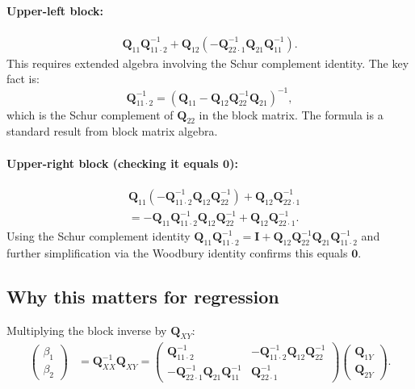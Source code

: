 \documentclass[12pt]{article}
\newcommand{\bfQ}{\mathbf{Q}}
\theoremstyle{definition}
\begin{document}
\paragraph{Upper-left block:}
\begin{align*}
\bfQ_{11}\bfQ_{11\cdot 2}^{-1} + \bfQ_{12}(-\bfQ_{22\cdot 1}^{-1}\bfQ_{21}\bfQ_{11}^{-1}).
\end{align*}
This requires extended algebra involving the Schur complement identity. The key fact is:
\[
\bfQ_{11\cdot 2}^{-1} = (\bfQ_{11} - \bfQ_{12}\bfQ_{22}^{-1}\bfQ_{21})^{-1},
\]
which is the Schur complement of $\bfQ_{22}$ in the block matrix. The formula is a standard result from block matrix algebra.

\paragraph{Upper-right block (checking it equals $\mathbf{0}$):}
\begin{align*}
&\bfQ_{11}(-\bfQ_{11\cdot 2}^{-1}\bfQ_{12}\bfQ_{22}^{-1}) + \bfQ_{12}\bfQ_{22\cdot 1}^{-1}\\
&= -\bfQ_{11}\bfQ_{11\cdot 2}^{-1}\bfQ_{12}\bfQ_{22}^{-1} + \bfQ_{12}\bfQ_{22\cdot 1}^{-1}.
\end{align*}
Using the Schur complement identity $\bfQ_{11}\bfQ_{11\cdot 2}^{-1} = \mathbf{I} + \bfQ_{12}\bfQ_{22}^{-1}\bfQ_{21}\bfQ_{11\cdot 2}^{-1}$ and further simplification via the Woodbury identity confirms this equals $\mathbf{0}$.

\subsection{Why this matters for regression}

Multiplying the block inverse by $\bfQ_{XY}$:
\begin{align*}
\begin{pmatrix} \beta_1 \\ \beta_2 \end{pmatrix}
&= \bfQ_{XX}^{-1}\bfQ_{XY}
= \begin{pmatrix}
\bfQ_{11\cdot 2}^{-1} & -\bfQ_{11\cdot 2}^{-1}\bfQ_{12}\bfQ_{22}^{-1} \\
-\bfQ_{22\cdot 1}^{-1}\bfQ_{21}\bfQ_{11}^{-1} & \bfQ_{22\cdot 1}^{-1}
\end{pmatrix}
\begin{pmatrix} \bfQ_{1Y} \\ \bfQ_{2Y} \end{pmatrix}.
\end{align*}
\end{document}
